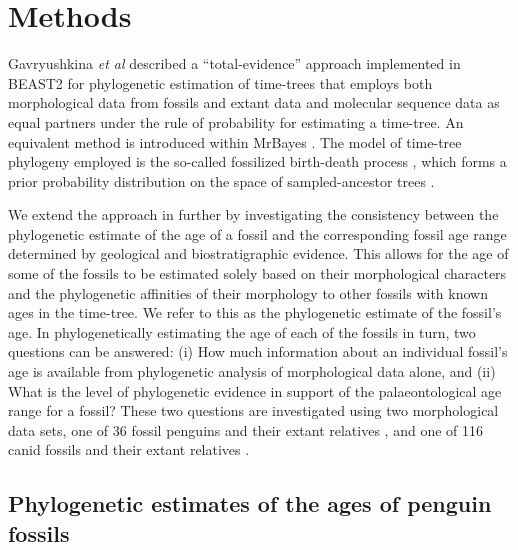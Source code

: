 \documentclass[11pt]{article}
\newcommand{\ncanidfossils}{{116}}
\begin{document}



\section*{Methods}
Gavryushkina {\it et al} \cite{gavryushkina2015bayesian} described a ``total-evidence'' approach implemented in BEAST2 \citep{Beast2} for phylogenetic estimation of time-trees that employs both morphological data from fossils and extant data and molecular sequence data as equal partners under the rule of probability for estimating a time-tree.  An equivalent method \citep{zhang2016} is introduced within MrBayes \cite{ronquist2012mrbayes}. 
The model of time-tree phylogeny employed is the so-called fossilized birth-death process \cite{Heath2014}, which forms a prior probability distribution on the space of sampled-ancestor trees \cite{gavr2014,Gavr2013}.

We extend the approach in \cite{gavryushkina2015bayesian}  further by investigating the consistency between the phylogenetic estimate of the age of a fossil and the corresponding fossil age range determined by geological and biostratigraphic evidence. 
This allows for the age of some of the fossils to be estimated solely based on their morphological characters and the phylogenetic affinities of their morphology to other fossils with known ages in the time-tree. 
We refer to this as the phylogenetic estimate of the fossil's age. 
In phylogenetically estimating the age of each of the fossils in turn, two questions can be answered: (i) How much information about an individual fossil's age is available from phylogenetic analysis of morphological data alone, and (ii) What is the level of phylogenetic evidence in support of the palaeontological age range for a fossil?
These two questions are investigated using two morphological data sets, one of 36 fossil penguins and their extant relatives \cite{ksepka2010,ksepka2012,gavryushkina2015bayesian}, and one of \ncanidfossils{} canid fossils and their extant relatives \cite{Slater2015}.

\subsection*{Phylogenetic estimates of the ages of penguin fossils}
\end{document}
